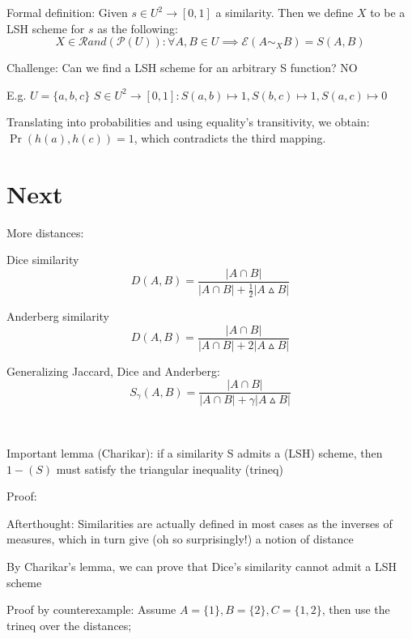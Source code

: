 \documentclass{report}
\newcommand{\probdist}{\mathcal{R}and}
\newcommand{\expect}{\mathcal{E}}
\newcommand{\powerset}{\mathcal{P}}
\begin{document}
	Formal definition: Given $s \in U^2 \to [0,1]$ a similarity. Then we define $X$ to be a LSH scheme for $s$ as the following:
	\begin{equation}
		X \in \probdist(\powerset(U)) : \forall A, B \in U \implies \expect(A\sim_X B) = S(A, B)
	\end{equation}
	
	Challenge: Can we find a LSH scheme for an arbitrary S function? NO
	
	E.g. $U = \{a, b, c\}$
	$S \in U^2 \rightarrow [0, 1] : S(a, b) \mapsto 1, S(b, c) \mapsto 1, S(a, c) \mapsto 0$ %
	
	Translating into probabilities and using equality's transitivity, we obtain: $\Pr(h(a), h(c))=1$, which contradicts the third mapping.
	
	 
	
	
	\chapter{Next}
	
	More distances:
	
	Dice similarity
	\begin{equation}
	\displaystyle D(A, B) = \frac{|A\cap B|}{|A\cap B| + \frac{1}{2}|A\vartriangle B|}
	\end{equation}
	
	Anderberg similarity
	\begin{equation}
	\displaystyle D(A, B) = \frac{|A\cap B|}{|A\cap B| + 2|A\vartriangle B|}
	\end{equation}
	
	Generalizing Jaccard, Dice and Anderberg: 
	\begin{equation}
	\displaystyle S_\gamma(A, B) = \frac{|A\cap B|}{|A\cap B| + \gamma|A\vartriangle B|}
	\end{equation}
	
	\
	
	Important lemma (Charikar): if a similarity S admits a (LSH) scheme, then $1-(S)$ must satisfy the triangular inequality (trineq)
	
	Proof: %
	
	Afterthought: Similarities are actually defined in most cases as the inverses of measures, which in turn give (oh so surprisingly!) a notion of distance
	\
	
	By Charikar's lemma, we can prove that Dice's similarity cannot admit a LSH scheme
	
	Proof by counterexample: Assume $A=\{1\}, B=\{2\}, C=\{1, 2\}$, then use the trineq over the distances; %
	
\end{document}
